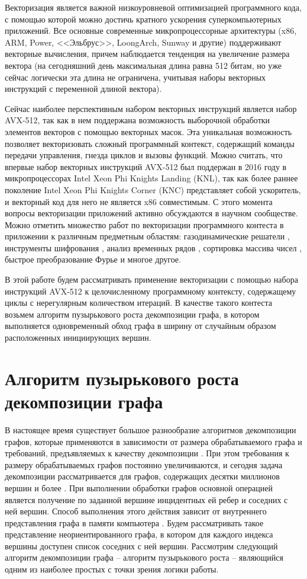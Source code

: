 \documentclass[
11pt,%
tightenlines,%
twoside,%
onecolumn,%
nofloats,%
nobibnotes,%
nofootinbib,%
superscriptaddress,%
noshowpacs,%
centertags]%
{revtex4}
\begin{document}
Векторизация является важной низкоуровневой оптимизацией программного кода, с помощью которой можно достичь кратного ускорения суперкомпьютерных приложений.
Все основные современные микропроцессорные архитектуры (x86, ARM, Power, <<Эльбрус>>, LoongArch, Sunway и другие) поддерживают векторные вычисления, причем наблюдается тенденция на увеличение размера вектора (на сегодняшний день максимальная длина равна 512 битам, но уже сейчас логически эта длина не ограничена, учитывая наборы векторных инструкций с переменной длиной
вектора).

Сейчас наиболее перспективным набором векторных инструкций является набор AVX-512, так как в нем поддержана возможность выборочной обработки элементов векторов с помощью векторных масок.
Эта уникальная возможность позволяет векторизовать сложный программный контекст, содержащий команды передачи управления, гнезда циклов и вызовы функций.
Можно считать, что впервые набор векторных инструкций AVX-512 был поддержан в 2016 году в микропроцессорах Intel Xeon Phi Knights Landing (KNL), так как более раннее поколение Intel Xeon Phi Knights Corner (KNC) представляет собой ускоритель, и векторный код для него не является x86 совместимым.
С этого момента вопросы векторизации приложений активно обсуждаются в научном сообществе.
Можно отметить множество работ по векторизации программного контеста в приложении к различным предметным областям: газодинамические решатели \cite{12-1Kulikov}, инструменты шифрования \cite{12-2Buhrow}, анализ временных рядов \cite{12-3Quislant}, сортировка массива чисел \cite{12-4Blacher}, быстрое преобразование Фурье \cite{12-5Sansone} и многое другое.

В этой работе будем рассматривать применение векторизации с помощью набора инструкций AVX-512 к целочисленному программному контексту, содержащему циклы с нерегулярным количеством итераций.
В качестве такого контеста возьмем алгоритм пузырькового роста декомпозиции графа, в котором выполняется одновременный обход графа в ширину от случайным образом расположенных инициирующих вершин.

\section{Алгоритм пузырькового роста декомпозиции графа}

В настоящее время существует большое разнообразие алгоритмов декомпозиции графов, которые применяются в зависимости от размера обрабатываемого графа и требований, предъявляемых к качеству декомпозиции \cite{13Ayall}.
При этом требования к размеру обрабатываемых графов постоянно увеличиваются, и сегодня задача декомпозиции рассматривается для графов, содержащих десятки миллионов вершин и более \cite{14Lee}.
При выполнении обработки графов основной операцией является получение по заданной вершине инцидентных ей ребер и соседних с ней вершин.
Способ выполнения этого действия зависит от внутреннего представления графа в памяти компьютера \cite{15Ahmed,16Salwasser}.
Будем рассматривать такое представление неориентированного графа, в котором для каждого индекса вершины доступен список соседних с ней вершин.
Рассмотрим следующий алгоритм декомпозиции графа -- алгоритм пузырькового роста -- являющийся одним из наиболее простых с точки зрения логики работы.
\end{document}
